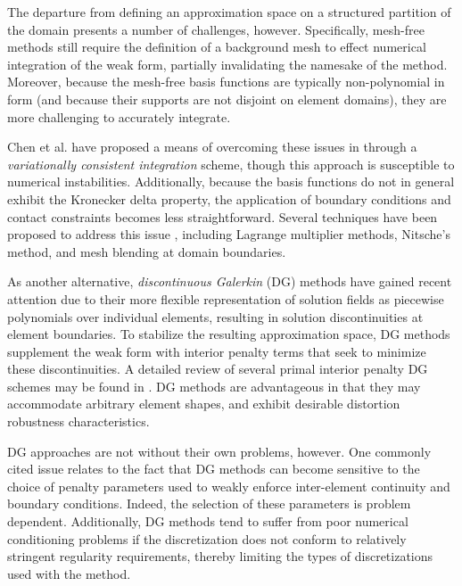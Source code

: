 		
		The departure from defining an approximation space on a structured partition of the domain presents a number of challenges, however. Specifically, mesh-free methods still require the definition of a background mesh to effect numerical integration of the weak form, partially invalidating the namesake of the method. Moreover, because the mesh-free basis functions are typically non-polynomial in form (and because their supports are not disjoint on element domains), they are more challenging to accurately integrate. 

		
		
		Chen et al. have proposed a means of overcoming these issues in \cite{Chen:13} through a \textit{variationally consistent integration} scheme, though this approach is susceptible to numerical instabilities. Additionally, because the basis functions do not in general exhibit the Kronecker delta property, the application of boundary conditions and contact constraints becomes less straightforward. Several techniques have been proposed to address this issue \cite{Mendez:04}, including Lagrange multiplier methods, Nitsche's method, and mesh blending at domain boundaries.
			
		As another alternative, \textit{discontinuous Galerkin} (DG) methods have gained recent attention due to their more flexible representation of solution fields as piecewise polynomials over individual elements, resulting in solution discontinuities at element boundaries. To stabilize the resulting approximation space, DG methods supplement the weak form with interior penalty terms that seek to minimize these discontinuities. A detailed review of several primal interior penalty DG schemes may be found in \cite{Riviere:08}. DG methods are advantageous in that they may accommodate arbitrary element shapes, and exhibit desirable distortion robustness characteristics.
		
		DG approaches are not without their own problems, however. One commonly cited issue relates to the fact that DG methods can become sensitive to the choice of penalty parameters used to weakly enforce inter-element continuity and boundary conditions. Indeed, the selection of these parameters is problem dependent. Additionally, DG methods tend to suffer from poor numerical conditioning problems if the discretization does not conform to relatively stringent regularity requirements, thereby limiting the types of discretizations used with the method.
		

